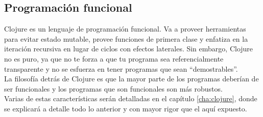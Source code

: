 \subsection{Programación funcional}

Clojure es un lenguaje de programación funcional. Va a proveer
herramientas para evitar estado mutable, provee funciones de primera
clase y enfatiza en la iteración recursiva en lugar de ciclos con
efectos laterales. Sin embargo, Clojure no es puro, ya que no te forza
a que tu programa sea referencialmente transparente y no se esfuerza
en tener programas que sean ``demostrables''.\\

La filosofía detrás de Clojure es que la mayor parte de los programas
deberían de ser funcionales y los programas que son funcionales son
más robustos.\\

Varias de estas características serán detalladas en el capítulo
\ref{cha:clojure}, donde se explicará a detalle todo lo anterior y con
mayor rigor que el aquí expuesto.